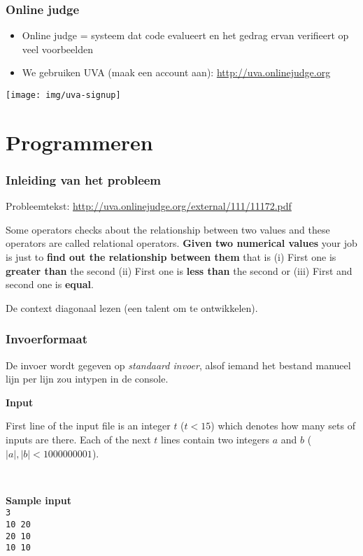\documentclass[12pt]{beamer}
\newcommand{\urlb}[1]{{\color{linkblue}\url{#1}}}
\begin{document}
\begin{frame}
\frametitle{Online judge}
\begin{itemize}
    \item Online judge = systeem dat code evalueert en het gedrag ervan verifieert op veel voorbeelden
    \item We gebruiken UVA (maak een account aan): \urlb{http://uva.onlinejudge.org}
\end{itemize}
\begin{center}
\texttt{[image: img/uva-signup]}
\end{center}
\end{frame}


\section{Programmeren}

\begin{frame}
\frametitle{Inleiding van het probleem}
Probleemtekst: \urlb{http://uva.onlinejudge.org/external/111/11172.pdf}

\begin{framed}
Some operators checks about the relationship between two values and these operators are called relational operators. \textbf{Given two numerical values} your job is just to \textbf{find out the relationship between them} that is (i) First one is \textbf{greater than} the second (ii) First one is \textbf{less than} the second or (iii) First and second one is \textbf{equal}.
\end{framed}
De context diagonaal lezen (een talent om te ontwikkelen).
\end{frame}

\begin{frame}[fragile]
\frametitle{Invoerformaat}
    De invoer wordt gegeven op \emph{standaard invoer}, alsof iemand het bestand manueel lijn per lijn zou intypen in de console.

\begin{framed}
\textbf{Input}

First line of the input file is an integer $t$ ($t < 15$) which denotes how many sets of inputs are there.
Each of the next $t$ lines contain two integers $a$ and $b$ ($|a|, |b| < 1000000001$).

~

\textbf{Sample input}\\
\texttt{3\\
10 20\\
20 10\\
10 10
}
\end{framed}
\end{frame}
\end{document}
